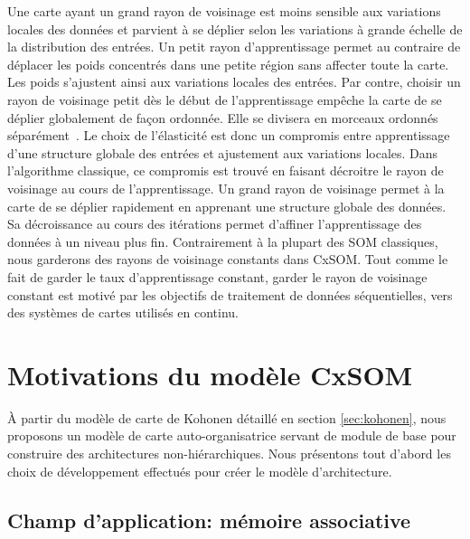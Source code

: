 \documentclass[../main]{subfiles}
\begin{document}
Une carte ayant un grand rayon de voisinage est moins sensible aux variations locales des données et parvient à se déplier selon les variations à grande échelle de la distribution des entrées.
Un petit rayon d'apprentissage permet au contraire de déplacer les poids concentrés dans une petite région sans affecter toute la carte. Les poids s'ajustent ainsi aux variations locales des entrées. Par contre, choisir un rayon de voisinage petit dès le début de l'apprentissage empêche la carte de se déplier globalement de façon ordonnée. Elle se divisera en morceaux ordonnés séparément~\parencite{Kohonen1995SelfOrganizingM}.
Le choix de l'élasticité est donc un compromis entre apprentissage d'une structure globale des entrées et ajustement aux variations locales.
Dans l'algorithme classique, ce compromis est trouvé en faisant décroitre le rayon de voisinage au cours de l'apprentissage. Un grand rayon de voisinage permet à la carte de se déplier rapidement en apprenant une structure globale des données. Sa décroissance au cours des itérations permet d'affiner l'apprentissage des données à un niveau plus fin. 
Contrairement à la plupart des SOM classiques, nous garderons des rayons de voisinage constants dans CxSOM. Tout comme le fait de garder le taux d'apprentissage constant, garder le rayon de voisinage constant est motivé par les objectifs de traitement de données séquentielles, vers des systèmes de cartes utilisés en continu.

\section{Motivations du modèle CxSOM}

\`A partir du modèle de carte de Kohonen détaillé en section \ref{sec:kohonen}, nous proposons un modèle de carte auto-organisatrice servant de module de base pour construire des architectures non-hiérarchiques. 
Nous présentons tout d'abord les choix de développement effectués pour créer le modèle d'architecture.

\subsection{Champ d'application: mémoire associative}
\end{document}
